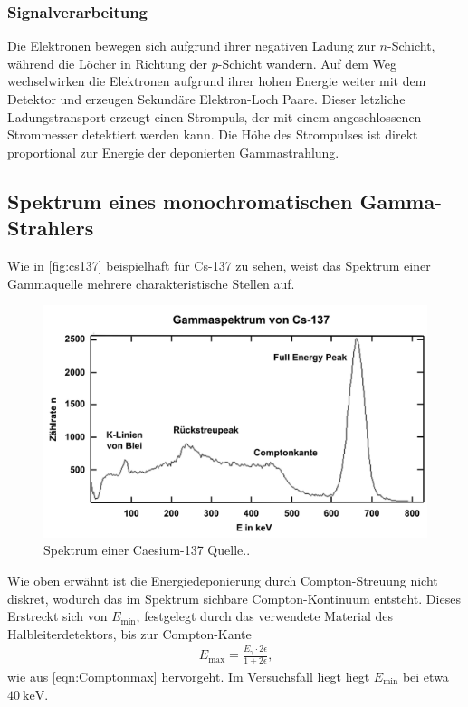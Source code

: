 \subsubsection{Signalverarbeitung}
Die Elektronen bewegen sich aufgrund ihrer negativen Ladung zur $n$-Schicht, während die Löcher in Richtung der $p$-Schicht wandern. Auf dem Weg wechselwirken die Elektronen aufgrund ihrer hohen Energie weiter mit dem Detektor und erzeugen Sekundäre Elektron-Loch Paare. Dieser letzliche Ladungstransport erzeugt einen Strompuls, der mit einem angeschlossenen Strommesser detektiert werden kann. Die Höhe des Strompulses ist direkt proportional zur Energie der deponierten Gammastrahlung.
\subsection{Spektrum eines monochromatischen Gamma-Strahlers}
Wie in \autoref{fig:cs137} beispielhaft für Cs-137 zu sehen, weist das Spektrum einer Gammaquelle mehrere charakteristische Stellen auf.
\begin{figure}[H]
  \centering
  \includegraphics[scale=0.3]{Ressourcen/cs137.png}
  \caption{Spektrum einer Caesium-137 Quelle.\cite{leifics137}.}
  \label{fig:cs137}
\end{figure}
Wie oben erwähnt ist die Energiedeponierung durch Compton-Streuung nicht diskret, wodurch das im Spektrum sichbare Compton-Kontinuum entsteht. Dieses Erstreckt sich von $E_\text{min}$, festgelegt durch das verwendete Material des Halbleiterdetektors, bis zur Compton-Kante
\begin{align} 
  E_\text{max}=\frac{E_\gamma\cdot2\epsilon}{1+2\epsilon}\text{,}
\end{align}
wie aus \autoref{eqn:Comptonmax} hervorgeht. Im Versuchsfall liegt liegt $E_\text{min}$ bei etwa $\SI{40}{\kilo\eV}$.
